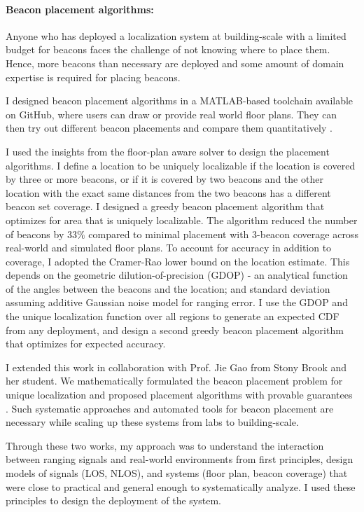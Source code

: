 \documentclass[10pt]{article}
\begin{document}
\paragraph{Beacon placement algorithms: }
Anyone who has deployed a localization system at building-scale with a limited budget for beacons faces the challenge of not knowing where to place them. %
Hence, more beacons than necessary are deployed and some amount of domain expertise is required for placing beacons. 

I designed beacon placement algorithms in a
MATLAB-based toolchain available on GitHub, where users can draw or provide real world floor plans. They can
then try out different beacon placements and compare them quantitatively \cite{rajagopal2016beacon}. 

I used the insights from the floor-plan aware solver to design the placement algorithms. 
I define a location to be uniquely localizable if the location is covered by three or more beacons, or if it is covered by two beacons and the other location with the exact same distances from the two beacons has a different beacon set coverage. I designed a greedy beacon placement algorithm that optimizes for area that is uniquely localizable.  The algorithm reduced the number of beacons by $33\%$ compared to minimal placement with 3-beacon coverage across real-world and simulated floor plans. 
To account for accuracy in addition to coverage, I adopted the Cramer-Rao lower bound on the location estimate. This depends on the geometric dilution-of-precision (GDOP) - an analytical function of the angles between the beacons and the location; and standard deviation assuming additive Gaussian noise model for ranging error. I use the GDOP and the unique localization function over all regions to generate an expected CDF from any deployment, and design a second greedy beacon placement algorithm that optimizes for expected accuracy.  

I extended this work in collaboration with
Prof. Jie Gao from Stony Brook and her student. We mathematically
formulated the beacon placement problem for unique localization and proposed placement
algorithms with provable guarantees \cite{beaconplacementtheory}. Such systematic approaches and automated tools for beacon
placement are necessary while scaling up these systems from labs to
building-scale. 

Through these two works, my approach was to understand the interaction between ranging signals and real-world environments from first principles, design models of signals (LOS, NLOS), and systems (floor plan, beacon coverage) that were close to practical and general enough to systematically analyze. I used these principles to design the deployment of the system. 
\end{document}
